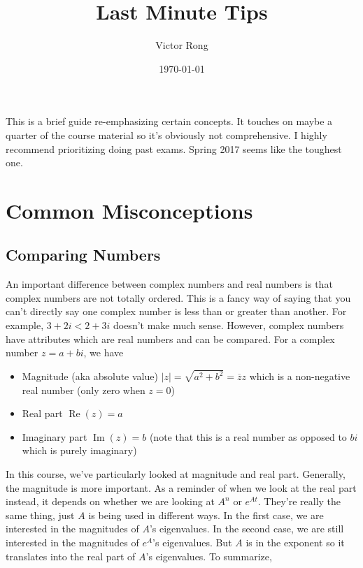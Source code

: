 \documentclass[11pt]{article}
\theoremstyle{plain} %
\theoremstyle{definition}
\theoremstyle{remark}
\DeclareMathOperator{\real}{Re}
\DeclareMathOperator{\imag}{Im}
\begin{document}
\title{Last Minute Tips}
\author{Victor Rong}

\date{\today}



This is a brief guide re-emphasizing certain concepts. It touches on maybe a quarter of the course material so it's obviously not comprehensive. I highly recommend prioritizing doing past exams. Spring 2017 seems like the toughest one.

\tableofcontents


\clearpage

\section{Common Misconceptions}

\subsection{Comparing Numbers}

An important difference between complex numbers and real numbers is that complex numbers are not totally ordered. This is a fancy way of saying that you can't directly say one complex number is less than or greater than another. For example, $3 + 2i < 2 + 3i$ doesn't make much sense. However, complex numbers have attributes which are real numbers and can be compared. For a complex number $z = a+bi$, we have
\begin{itemize}
\item Magnitude (aka absolute value) $|z| = \sqrt{a^2+b^2} = \overline{z}z$ which is a non-negative real number (only zero when $z=0$)
\item Real part $\real{(z)} = a$
\item Imaginary part $\imag{(z)} = b$ (note that this is a real number as opposed to $bi$ which is purely imaginary)
\end{itemize}

In this course, we've particularly looked at magnitude and real part. Generally, the magnitude is more important. As a reminder of when we look at the real part instead, it depends on whether we are looking at $A^n$ or $e^{At}$. They're really the same thing, just $A$ is being used in different ways. In the first case, we are interested in the magnitudes of $A$'s eigenvalues. In the second case, we are still interested in the magnitudes of $e^A$'s eigenvalues. But $A$ is in the exponent so it translates into the real part of $A$'s eigenvalues. To summarize,
\end{document}
